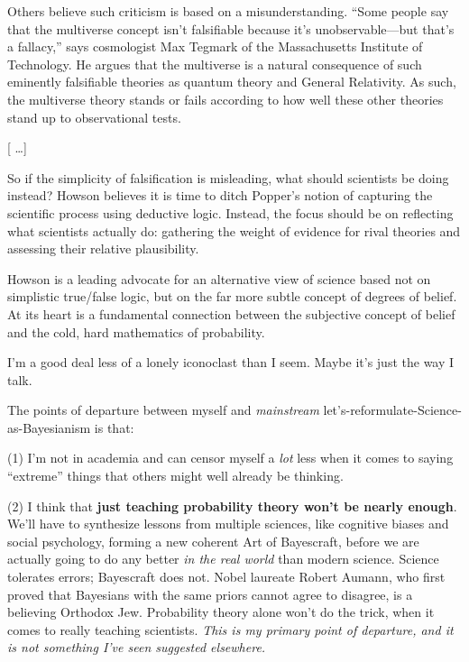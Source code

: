 {
 Others believe such criticism is based on a misunderstanding.
``Some people say that the multiverse concept
isn't falsifiable because it's
unobservable---but that's a
fallacy,'' says cosmologist Max Tegmark of the
Massachusetts Institute of Technology. He argues that the multiverse is
a natural consequence of such eminently falsifiable theories as quantum
theory and General Relativity. As such, the multiverse theory stands or
fails according to how well these other theories stand up to
observational tests.}

{
 [ \ldots ]}

{
 So if the simplicity of falsification is misleading, what should
scientists be doing instead? Howson believes it is time to ditch
Popper's notion of capturing the scientific process
using deductive logic. Instead, the focus should be on reflecting what
scientists actually do: gathering the weight of evidence for rival
theories and assessing their relative plausibility.}

{
 Howson is a leading advocate for an alternative view of science
based not on simplistic true/false logic, but on the far more subtle
concept of degrees of belief. At its heart is a fundamental connection
between the subjective concept of belief and the cold, hard mathematics
of probability.}

{
 I'm a good deal less of a lonely iconoclast than I
seem. Maybe it's just the way I talk.}

{
 The points of departure between myself and \textit{mainstream}
let's-reformulate-Science-as-Bayesianism is that:}

{
 (1) I'm not in academia and can censor myself a
\textit{lot} less when it comes to saying
``extreme'' things that others might
well already be thinking.}

{
 (2) I think that \textbf{just teaching probability theory
won't be nearly enough}. We'll have to
synthesize lessons from multiple sciences, like cognitive biases and
social psychology, forming a new coherent Art of Bayescraft, before we
are actually going to do any better \textit{in the real world} than
modern science. Science tolerates errors; Bayescraft does not. Nobel
laureate Robert Aumann, who first proved that Bayesians with the same
priors cannot agree to disagree, is a believing Orthodox Jew.
Probability theory alone won't do the trick, when it
comes to really teaching scientists. \textit{This is my primary point
of departure, and it is not something I've seen
suggested elsewhere.}}

